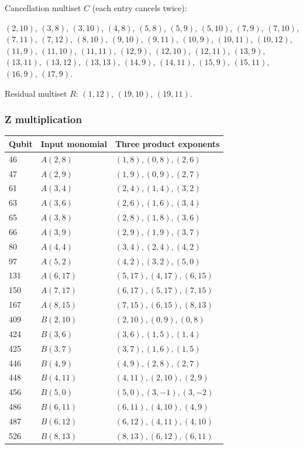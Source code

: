 \documentclass{article}
\begin{document}
Cancellation multiset \(C\) (each entry cancels twice):

\((2, 10)\), \((3, 8)\), \((3, 10)\), \((4, 8)\), \((5, 8)\), \((5, 9)\), \((5, 10)\), \((7, 9)\),
\((7, 10)\), \((7, 11)\), \((7, 12)\), \((8, 10)\), \((9, 10)\), \((9, 11)\), \((10, 9)\),
\((10, 11)\), \((10, 12)\), \((11, 9)\), \((11, 10)\), \((11, 11)\), \((12, 9)\), \((12, 10)\),
\((12, 11)\), \((13, 9)\), \((13, 11)\), \((13, 12)\), \((13, 13)\), \((14, 9)\), \((14, 11)\),
\((15, 9)\), \((15, 11)\), \((16, 9)\), \((17, 9)\).

Residual multiset \(R\): \((1, 12)\), \((19, 10)\), \((19, 11)\).

\subsubsection{Z multiplication}\label{app:witness-z}

\begin{longtable}{lll}
  Qubit & Input monomial & Three product exponents \\
  \hline
  \endhead
  46 & \(A(2, 8)\) & \((1, 8), (0, 8), (2, 6)\) \\
  47 & \(A(2, 9)\) & \((1, 9), (0, 9), (2, 7)\) \\
  61 & \(A(3, 4)\) & \((2, 4), (1, 4), (3, 2)\) \\
  63 & \(A(3, 6)\) & \((2, 6), (1, 6), (3, 4)\) \\
  65 & \(A(3, 8)\) & \((2, 8), (1, 8), (3, 6)\) \\
  66 & \(A(3, 9)\) & \((2, 9), (1, 9), (3, 7)\) \\
  80 & \(A(4, 4)\) & \((3, 4), (2, 4), (4, 2)\) \\
  97 & \(A(5, 2)\) & \((4, 2), (3, 2), (5, 0)\) \\
  131 & \(A(6, 17)\) & \((5, 17), (4, 17), (6, 15)\) \\
  150 & \(A(7, 17)\) & \((6, 17), (5, 17), (7, 15)\) \\
  167 & \(A(8, 15)\) & \((7, 15), (6, 15), (8, 13)\) \\
  409 & \(B(2, 10)\) & \((2, 10), (0, 9), (0, 8)\) \\
  424 & \(B(3, 6)\) & \((3, 6), (1, 5), (1, 4)\) \\
  425 & \(B(3, 7)\) & \((3, 7), (1, 6), (1, 5)\) \\
  446 & \(B(4, 9)\) & \((4, 9), (2, 8), (2, 7)\) \\
  448 & \(B(4, 11)\) & \((4, 11), (2, 10), (2, 9)\) \\
  456 & \(B(5, 0)\) & \((5, 0), (3, -1), (3, -2)\) \\
  486 & \(B(6, 11)\) & \((6, 11), (4, 10), (4, 9)\) \\
  487 & \(B(6, 12)\) & \((6, 12), (4, 11), (4, 10)\) \\
  526 & \(B(8, 13)\) & \((8, 13), (6, 12), (6, 11)\) \\
\end{longtable}
\end{document}
